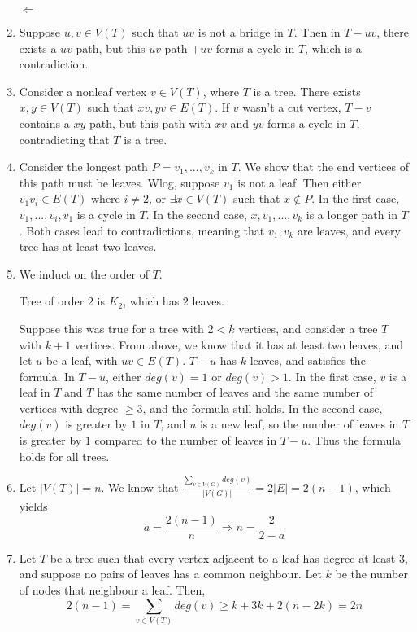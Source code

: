 \documentclass[11pt]{article}
\begin{document}
\begin{enumerate}[1]
        $\Leftarrow$ 
        
    \item %
        Suppose $u, v \in V(T)$ such that $uv$ is not a bridge in $T$. Then in 
        $T - uv$, there exists a $uv$ path, but this $uv$ path $+ uv$ forms a 
        cycle in $T$, which is a contradiction. 
    \item %
        Consider a nonleaf vertex $v \in V(T)$, where $T$ is a tree. There exists
        $x, y \in V(T)$ such that $xv, yv \in E(T)$. If $v$ wasn't a cut vertex,
        $T - v$ contains a $xy$ path, but this path with $xv$ and $yv$ forms a
        cycle in $T$, contradicting that $T$ is a tree.

    \item %
        Consider the longest path $P = v_1, ..., v_k$ in $T$. We show that 
        the end vertices of this path must be leaves. Wlog, suppose $v_1$ 
        is not a leaf. Then either $v_1v_i \in E(T)$ where $i \neq 2$, or 
        $\exists x \in V(T)$ such that $x \notin P$. In the first case,
        $v_1, ..., v_i, v_1$ is a cycle in $T$. In the second case, 
        $x, v_1, ..., v_k$ is a longer path in $T$. Both cases lead to 
        contradictions, meaning that $v_1, v_k$ are leaves, and every tree
        has at least two leaves. 
        
    \item %
        We induct on the order of $T$.

        Tree of order $2$ is $K_2$, which has $2$ leaves. 

        Suppose this was true for a tree with $2 < k$ vertices, and consider 
        a tree $T$ with $k + 1$ vertices. From above, we know that it has at 
        least two leaves, and let $u$ be a leaf, with $uv \in E(T)$. 
        $T - u$ has $k$ leaves, and satisfies the formula. In $T - u$, either
        $deg(v) = 1$ or $deg(v) > 1$. In the first case, $v$ is a leaf in $T$
        and $T$ has the same number of leaves and the same number of vertices
        with degree $\geq 3$, and the formula still holds. In the second case,
        $deg(v)$ is greater by $1$ in $T$, and $u$ is a new leaf, so the number 
        of leaves in $T$ is greater by $1$ compared to the number of leaves in 
        $T - u$. Thus the formula holds for all trees. 

    \item %
        Let $|V(T)| = n$. We know that $\frac{\sum_{v \in V(G)} deg(v)}{|V(G)|} 
        = 2|E| = 2(n - 1)$, which yields
        $$ a = \frac{2(n-1)}{n} \Rightarrow n = \frac{2}{2-a}$$ 

    \item %
        Let $T$ be a tree such that every vertex adjacent to a leaf has degree
        at least $3$, and suppose no pairs of leaves has a common neighbour. 
        Let $k$ be the number of nodes that neighbour a leaf. Then,
        $$2(n-1) = \sum_{v \in V(T)} deg(v) \geq k + 3k + 2(n-2k) = 2n$$


\end{enumerate}
\end{document}

